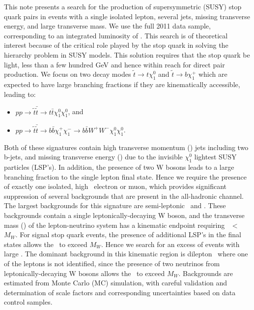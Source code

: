 
This note presents a search for the production of supersymmetric (SUSY) stop quark pairs in events with a 
single isolated lepton, several jets, missing transverse energy, and large transverse mass. We use the full 
2011 data sample, corresponding to an integrated luminosity of \lumi. 
This search is of theoretical interest because of the critical role played 
by the stop quark in solving the hierarchy problem in SUSY models. This solution requires that the stop quark 
be light, less than a few hundred GeV and hence within reach for direct pair production. We focus on two decay modes 
$\tilde{t}\rightarrow t\chi^0_1$ and $\tilde{t}\rightarrow b \chi^+_1$  which are expected
to have large branching fractions if they are kinematically accessible, leading to:

\begin{itemize}
\item $pp\rightarrow\tilde{t}\bar{\tilde{t}}\rightarrow t\bar{t}\chi^0_1\chi^0_1$, and
\item $pp\rightarrow\tilde{t}\bar{\tilde{t}}\rightarrow b\bar{b}\chi^+_1\chi^-_1 \rightarrow b\bar{b}W^+W^-\chi^0_1\chi^0_1$.
\end{itemize}

Both of these signatures contain high transverse momentum (\pt) jets including two b-jets, and missing transverse 
energy (\met) due to the invisible $\chi^0_1$ lightest SUSY particles (LSP's). In addition, the presence of
two W bosons leads to a large branching fraction to the single lepton final state. Hence we require the presence
of exactly one isolated, high \pt\ electron or muon, which provides significant suppression of several backgrounds
that are present in the all-hadronic channel. The largest backgrounds for this signature are semi-leptonic \ttbar\
and \wjets. These backgrounds contain a single leptonically-decaying W boson, and the transverse mass (\mt)
of the lepton-neutrino system has a kinematic endpoint requiring \mt\ $<$ $M_W$. For signal stop quark events,
the presence of additional LSP's in the final states allows the \mt\ to exceed $M_W$. Hence we search for an excess
of events with large \mt. The dominant background in this kinematic region is dilepton \ttbar\ where one of the
leptons is not identified, since the presence of two neutrinos from leptonically-decaying W bosons allows the 
\mt\ to exceed $M_W$. Backgrounds are estimated from Monte Carlo (MC) simulation, with careful validation 
and determination of scale factors and corresponding uncertainties based on data control samples.

